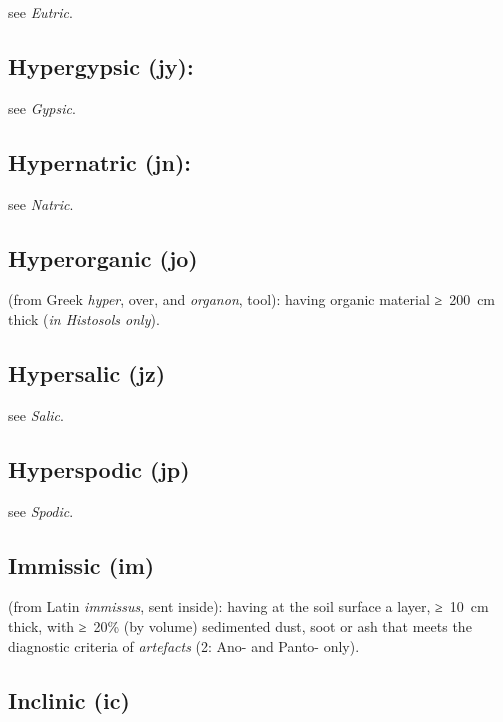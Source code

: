 \documentclass[
  letterpaper,
  DIV=11,
  numbers=noendperiod]{scrreprt}
\begin{document}
see \emph{Eutric}.

\hypertarget{hypergypsic-jy}{%
\subsection{Hypergypsic (jy):}\label{hypergypsic-jy}}

see \emph{Gypsic}.

\hypertarget{hypernatric-jn}{%
\subsection{Hypernatric (jn):}\label{hypernatric-jn}}

see \emph{Natric}.

\hypertarget{hyperorganic-jo}{%
\subsection{Hyperorganic (jo)}\label{hyperorganic-jo}}

(from Greek \emph{hyper}, over, and \emph{organon}, tool): having
organic material ≥~200~cm thick (\emph{in Histosols only}).

\hypertarget{hypersalic-jz}{%
\subsection{Hypersalic (jz)}\label{hypersalic-jz}}

see \emph{Salic}.

\hypertarget{hyperspodic-jp}{%
\subsection{Hyperspodic (jp)}\label{hyperspodic-jp}}

see \emph{Spodic}.

\hypertarget{immissic-im}{%
\subsection{Immissic (im)}\label{immissic-im}}

(from Latin \emph{immissus}, sent inside): having at the soil surface a
layer, ≥~10~cm thick, with ≥~20\% (by volume) sedimented dust, soot or
ash that meets the diagnostic criteria of \emph{artefacts} (2: Ano- and
Panto- only).

\hypertarget{inclinic-ic}{%
\subsection{Inclinic (ic)}\label{inclinic-ic}}
\end{document}
